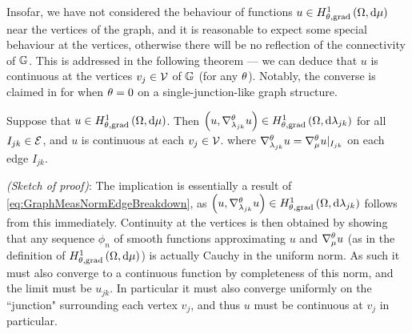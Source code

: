 Insofar, we have not considered the behaviour of functions $u\in H^1_{\theta, \mathrm{grad}}\left( \Omega, \mathrm{d}\mu \right)$ near the vertices of the graph, and it is reasonable to expect some special behaviour at the vertices, otherwise there will be no reflection of the connectivity of $\mathbb{G}$.
This is addressed in the following theorem --- we can deduce that $u$ is continuous at the vertices $v_j\in \mathcal{V}$ of $\mathbb{G}$ (for any $\theta$).
Notably, the converse is claimed in \cite[Section~4]{zhikov2002homogenization} for when $\theta=0$ on a single-junction-like graph structure.
\begin{theorem} \label{thm:CharOfGradSob}
	Suppose that $u \in H^1_{\theta, \mathrm{grad}}\left( \Omega, \mathrm{d}\mu \right)$.
	Then $\left( u, \nabla^{\theta}_{\lambda_{jk}}u \right)\in H^1_{\theta, \mathrm{grad}}\left( \Omega, \mathrm{d}\lambda_{jk} \right)$ for all $I_{jk}\in \mathcal{E}$, and $u$ is continuous at each $v_j\in \mathcal{V}$.
	where $\nabla^{\theta}_{\lambda_{jk}}u = \nabla^{\theta}_{\mu}u\vert_{I_{jk}}$ on each edge $I_{jk}$.
\end{theorem}
\textit{(Sketch of proof)}: 
	The implication is essentially a result of \eqref{eq:GraphMeasNormEdgeBreakdown}, as $\left( u, \nabla^{\theta}_{\lambda_{jk}}u \right)\in H^1_{\theta, \mathrm{grad}}\left( \Omega, \mathrm{d}\lambda_{jk} \right)$ follows from this immediately.
	Continuity at the vertices is then obtained by showing that any sequence $\phi_n$ of smooth functions approximating $u$ and $\nabla^{\theta}_\mu u$ (as in the definition of $H^1_{\theta, \mathrm{grad}}\left( \Omega, \mathrm{d}\mu \right)$) is actually Cauchy in the uniform norm.
	As such it must also converge to a continuous function by completeness of this norm, and the limit must be $u_{jk}$.
	In particular it must also converge uniformly on the ``junction" surrounding each vertex $v_j$, and thus $u$ must be continuous at $v_j$ in particular.
